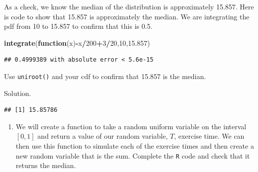 \documentclass[
]{book}
\newenvironment{Shaded}{\begin{snugshade}}{\end{snugshade}}
\newcommand{\ControlFlowTok}[1]{\textcolor[rgb]{0.13,0.29,0.53}{\textbf{#1}}}
\newcommand{\DecValTok}[1]{\textcolor[rgb]{0.00,0.00,0.81}{#1}}
\newcommand{\FloatTok}[1]{\textcolor[rgb]{0.00,0.00,0.81}{#1}}
\newcommand{\KeywordTok}[1]{\textcolor[rgb]{0.13,0.29,0.53}{\textbf{#1}}}
\newcommand{\NormalTok}[1]{#1}
\newcommand{\OperatorTok}[1]{\textcolor[rgb]{0.81,0.36,0.00}{\textbf{#1}}}
\providecommand{\tightlist}{%
  \setlength{\itemsep}{0pt}\setlength{\parskip}{0pt}}
\begin{document}
As a check, we know the median of the distribution is approximately 15.857. Here is code to show that 15.857 is approximately the median. We are integrating the pdf from 10 to 15.857 to confirm that this is 0.5.

\begin{Shaded}
\begin{Highlighting}[]
\KeywordTok{integrate}\NormalTok{(}\ControlFlowTok{function}\NormalTok{(x)}\OperatorTok{-}\NormalTok{x}\OperatorTok{/}\DecValTok{200}\OperatorTok{+}\DecValTok{3}\OperatorTok{/}\DecValTok{20}\NormalTok{,}\DecValTok{10}\NormalTok{,}\FloatTok{15.857}\NormalTok{)}
\end{Highlighting}
\end{Shaded}

\begin{verbatim}
## 0.4999389 with absolute error < 5.6e-15
\end{verbatim}

Use \texttt{uniroot()} and your cdf to confirm that 15.857 is the median.

Solution.

\begin{Shaded}
\end{Shaded}

\begin{verbatim}
## [1] 15.85786
\end{verbatim}

\begin{enumerate}
\def\labelenumi{\alph{enumi}.}
\setcounter{enumi}{3}
\tightlist
\item
  We will create a function to take a random uniform variable on the interval \([0,1]\) and return a value of our random variable, \(T\), exercise time. We can then use this function to simulate each of the exercise times and then create a new random variable that is the sum. Complete the \texttt{R} code and check that it returns the median.
\end{enumerate}
\end{document}
